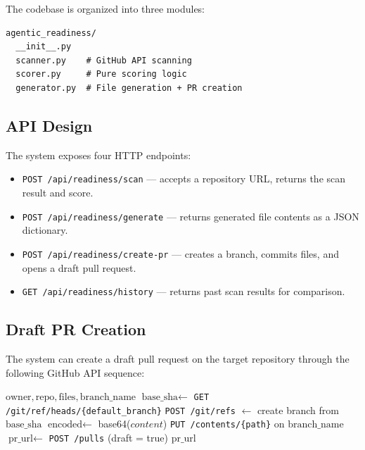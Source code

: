 \documentclass[11pt,twocolumn]{article}
\begin{document}
The codebase is organized into three modules:

\begin{lstlisting}[language={},caption={Module structure},label={lst:modules}]
agentic_readiness/
  __init__.py
  scanner.py    # GitHub API scanning
  scorer.py     # Pure scoring logic
  generator.py  # File generation + PR creation
\end{lstlisting}

\subsection{API Design}

The system exposes four HTTP endpoints:

\begin{itemize}[leftmargin=1.5em]
    \item \texttt{POST /api/readiness/scan} --- accepts a repository URL,
          returns the scan result and score.
    \item \texttt{POST /api/readiness/generate} --- returns generated
          file contents as a JSON dictionary.
    \item \texttt{POST /api/readiness/create-pr} --- creates a branch,
          commits files, and opens a draft pull request.
    \item \texttt{GET /api/readiness/history} --- returns past scan
          results for comparison.
\end{itemize}

\subsection{Draft PR Creation}

The system can create a draft pull request on the target repository
through the following GitHub API sequence:

\begin{algorithm}[H]
\caption{Draft PR Creation}
\label{alg:pr}
\begin{algorithmic}[1]
\REQUIRE $\text{owner}, \text{repo}, \text{files}, \text{branch\_name}$
\STATE $\text{base\_sha} \gets$ \texttt{GET /git/ref/heads/\{default\_branch\}}
\STATE \texttt{POST /git/refs} $\gets$ create branch from $\text{base\_sha}$
    \STATE $\text{encoded} \gets$ base64($content$)
    \STATE \texttt{PUT /contents/\{path\}} on $\text{branch\_name}$
\ENDFOR
\STATE $\text{pr\_url} \gets$ \texttt{POST /pulls} (draft = true)
\RETURN $\text{pr\_url}$
\end{algorithmic}
\end{algorithm}
\end{document}
